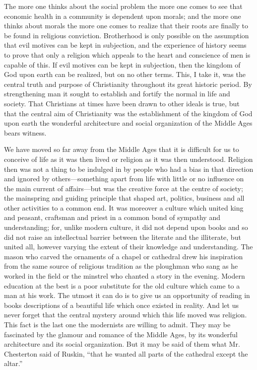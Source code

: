 \documentclass{book}
\begin{document}
The more one thinks about the social problem the more one comes to see that economic health in a community is dependent upon morals; and the more one thinks about morals the more one comes to realize that their roots are finally to be found in religious conviction. Brotherhood is only possible on the assumption that evil motives can be kept in subjection, and the experience of history seems to prove that only a religion which appeals to the heart and conscience of men is capable of this. If evil motives can be kept in subjection, then the kingdom of God upon earth can be realized, but on no other terms. This, I take it, was the central truth and purpose of Christianity throughout its great historic period. By strengthening man it sought to establish and fortify the normal in life and society. That Christians at times have been drawn to other ideals is true, but that the central aim of Christianity was the establishment of the kingdom of God upon earth the wonderful architecture and social organization of the Middle Ages bears witness.

We have moved so far away from the Middle Ages that it is difficult for us to conceive of life as it was then lived or religion as it was then understood. Religion then was not a thing to be indulged in by people who had a bias in that direction and ignored by others—something apart from life with little or no influence on the main current of affairs—but was the creative force at the centre of society; the mainspring and guiding principle that shaped art, politics, business and all other activities to a common end. It was moreover a culture which united king and peasant, craftsman and priest in a common bond of sympathy and understanding; for, unlike modern culture, it did not depend upon books and so did not raise an intellectual barrier between the literate and the illiterate, but united all, however varying the extent of their knowledge and understanding. The mason who carved the ornaments of a chapel or cathedral drew his inspiration from the same source of religious tradition as the ploughman who sang as he worked in the field or the minstrel who chanted a story in the evening. Modern education at the best is a poor substitute for the old culture which came to a man at his work. The utmost it can do is to give us an opportunity of reading in books descriptions of a beautiful life which once existed in reality. And let us never forget that the central mystery around which this life moved was religion. This fact is the last one the modernists are willing to admit. They may be fascinated by the glamour and romance of the Middle Ages, by its wonderful architecture and its social organization. But it may be said of them what Mr. Chesterton said of Ruskin, “that he wanted all parts of the cathedral except the altar.”
\end{document}
